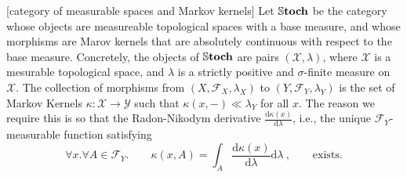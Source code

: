 \begin{defn}
    [category of measurable spaces and Markov kernels]
    Let $\mathbb{S}\mathbf{toch}$ be the category whose
    objects are measureable topological spaces with a base measure, and 
    whose morphisms are Marov kernels that are absolutely continuous with respect to the base measure.
    Concretely,
    the objects of $\mathbb{S}\mathbf{toch}$ are pairs $(\mathcal X, \lambda)$, where $\mathcal X$ is a mesurable topological space, and $\lambda$ is a strictly positive and $\sigma$-finite measure on $\mathcal X$.
    The collection of morphisms from 
    $(X,\mathcal F_X, \lambda_X)$ to $(Y, \mathcal F_Y, \lambda_Y)$ is the 
    set of Markov Kernels $\kappa : \mathcal X \to \mathcal Y$
    such that 
    $\kappa(x,-) \ll \lambda_Y$ for all $x$.        
    The reason we require this is so that the Radon-Nikodym derivative
    $\frac{\mathrm d \kappa(x)}{\mathrm d\lambda}$, i.e., the unique 
    $\mathcal F_Y$-measurable function satisfying
    \[ 
        \forall x. \forall A \in \mathcal F_Y.\qquad
        \kappa(x,A) = \int_{A} \frac{\mathrm d \kappa(x)}{\mathrm d\lambda} \mathrm d \lambda~,
        \qquad\text{exists.}
    \]
    

\end{defn}
